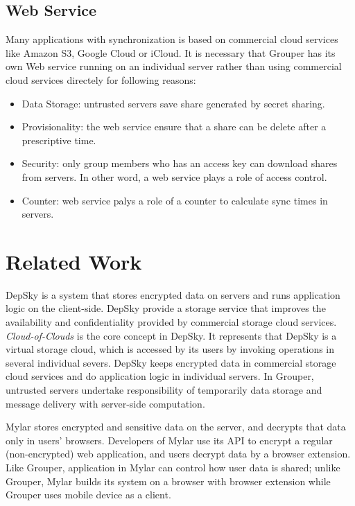 \documentclass[twocolumn,10pt]{article}
\begin{document}
\subsection{Web Service}
Many applications with synchronization is based on commercial cloud services like Amazon S3, Google Cloud or iCloud. It is necessary that Grouper has its own Web service running on an individual server rather than using commercial cloud services directely for following reasons:

\begin{itemize}
\setlength{\itemsep}{1pt}
\setlength{\parskip}{0pt}
\setlength{\parsep}{0pt}
    \item Data Storage: untrusted servers save share generated by secret sharing.
    \item Provisionality: the web service ensure that a share can be delete after a prescriptive time.
    \item Security: only group members who has an access key can download shares from servers. In other word, a web service plays a role of access control.
    \item Counter: web service palys a role of a counter to calculate sync times in servers.
\end{itemize}

\section{Related Work}

DepSky\cite{bessani2013depsky} is a system that stores encrypted data on servers and runs application logic on the client-side\cite{wang2016sieve}. DepSky provide a storage service that improves the availability and confidentiality provided by commercial storage cloud services. \emph{Cloud-of-Clouds} is the core concept in DepSky. It represents that DepSky is a virtual storage cloud, which is accessed by its users by invoking operations in several individual severs. DepSky keeps encrypted data in commercial storage cloud services and do application logic in individual servers. In Grouper,  untrusted servers undertake responsibility of temporarily data storage and message delivery with server-side computation.

Mylar\cite{popa2014building} stores encrypted and sensitive data on the server, and decrypts that data only in users’ browsers. Developers of Mylar use its API to encrypt a regular (non-encrypted) web application, and users decrypt data by a browser extension. Like Grouper, application in Mylar can control how user data is shared\cite{wang2016sieve}; unlike Grouper, Mylar builds its system on a browser with browser extension while Grouper uses mobile device as a client.
\end{document}
